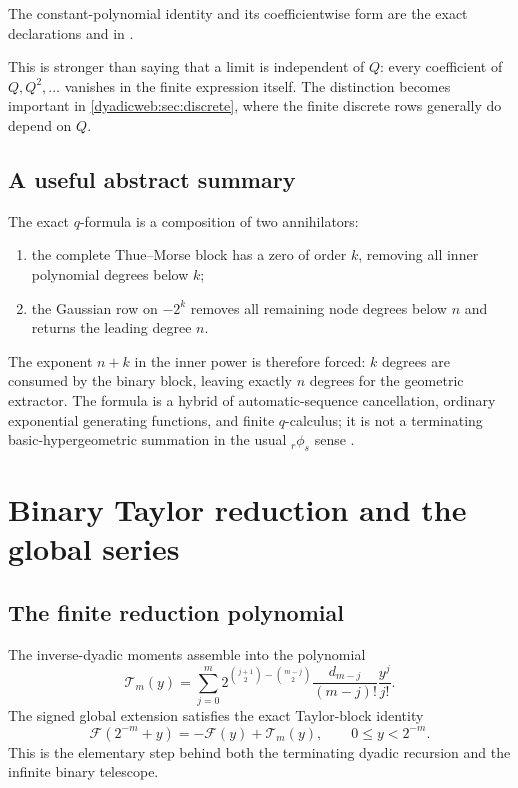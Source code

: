 \documentclass[11pt,oneside]{article}
\theoremstyle{definition}
\theoremstyle{remark}
\begin{document}
The constant-polynomial identity and its coefficientwise form are the exact declarations
 and
 in
.

This is stronger than saying that a limit is independent of $Q$: every coefficient of
$Q,Q^2,\ldots$ vanishes in the finite expression itself.  The distinction becomes important
in \cref{dyadicweb:sec:discrete}, where the finite discrete rows generally do depend on $Q$.

\subsection{A useful abstract summary}

The exact $q$-formula is a composition of two annihilators:
\begin{enumerate}
\item the complete Thue--Morse block has a zero of order $k$, removing all inner polynomial
      degrees below $k$;
\item the Gaussian row on $-2^k$ removes all remaining node degrees below $n$ and returns the
      leading degree $n$.
\end{enumerate}
The exponent $n+k$ in the inner power is therefore forced: $k$ degrees are consumed by the
binary block, leaving exactly $n$ degrees for the geometric extractor.  The formula is a
hybrid of automatic-sequence cancellation, ordinary exponential generating functions, and
finite $q$-calculus; it is not a terminating basic-hypergeometric summation in the usual
${}_r\phi_s$ sense \cite{dyadicweb:gasper2004,dyadicweb:dlmf17}.

\section{Binary Taylor reduction and the global series}
\label{dyadicweb:sec:binary}

\subsection{The finite reduction polynomial}

The inverse-dyadic moments assemble into the polynomial
\begin{equation}
 \mathcal T_m(y)=
 \sum_{j=0}^{m}
 2^{\binom{j+1}{2}-\binom{m-j}{2}}
 \frac{d_{m-j}}{(m-j)!}\frac{y^j}{j!}.                    \label{dyadicweb:eq:T-def-local}
\end{equation}
The signed global extension satisfies the exact Taylor-block identity
\begin{equation}
 \mathcal F(2^{-m}+y)=-\mathcal F(y)+\mathcal T_m(y),
 \qquad 0\le y<2^{-m}.                                    \label{dyadicweb:eq:T-reduction-local}
\end{equation}
This is the elementary step behind both the terminating dyadic recursion and the infinite
binary telescope.
\end{document}
